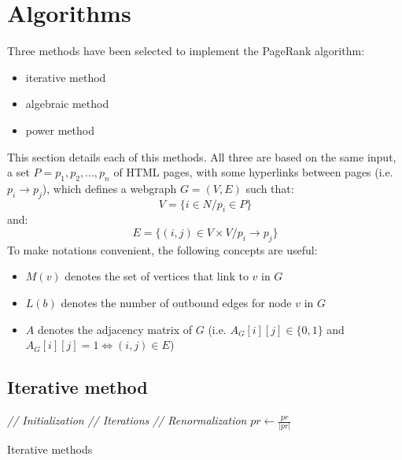 \documentclass[pdftex,12pt,a4paper]{article}
\begin{document}
\section{Algorithms}

Three methods have been selected to implement the PageRank algorithm:
\begin{itemize}
\item iterative method
\item algebraic method
\item power method
\end{itemize}
This section details each of this methods. All three are based on the same input, a set $P = p_1, p_2, ..., p_n$ of HTML pages, with some hyperlinks between pages (i.e. $p_i \rightarrow p_j$), which defines a webgraph $G = \left(V, E\right)$ such that:
$$V = \{i \in N / p_i \in P\}$$
and:
$$E = \{\left(i, j\right) \in V \times V / p_i \rightarrow p_j\}$$
To make notations convenient, the following concepts are useful:
\begin{itemize}
\item $M\left(v\right)$ denotes the set of vertices that link to $v$ in $G$
\item $L\left(b\right)$ denotes the number of outbound edges for node $v$ in $G$
\item $A$ denotes the adjacency matrix of $G$ (i.e. $A_G\left[i\right]\left[j\right] \in \{0, 1\}$ and $A_G\left[i\right]\left[j\right] = 1 \Leftrightarrow \left(i, j\right) \in E$)
\end{itemize}

\subsection{Iterative method}
\IncMargin{1em}
\begin{algorithm}[H]
\BlankLine
\Indm
{}
\Indp
\BlankLine
\emph{// Initialization}\;
\emph{// Iterations}\;
\emph{// Renormalization}\;
$pr\leftarrow\frac{pr}{|pr|}$\;
\BlankLine
\caption{Iterative methods}\label{algo_iterative_method}
\end{algorithm}
\DecMargin{1em}
\end{document}
